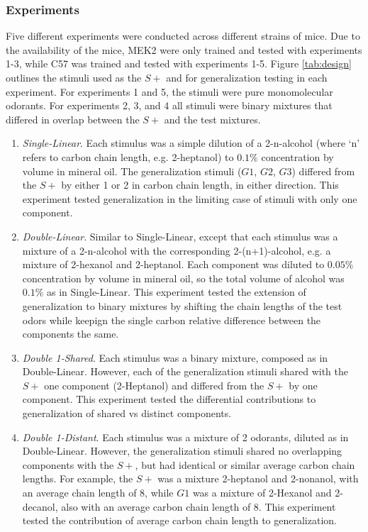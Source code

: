 \subsubsection*{Experiments}
\label{sec:methods_experiment_types}
Five different experiments were conducted across different strains of mice. 
Due to the availability of the mice, MEK2 were only trained and tested with experiments 1-3, while C57 was trained and tested with experiments 1-5.  
Figure \ref{tab:design} outlines the stimuli used as the $S+$ and for generalization testing in each experiment. 
For experiments 1 and 5, the stimuli were pure monomolecular odorants. 
For experiments 2, 3, and 4 all stimuli were binary mixtures that differed in overlap between the $S+$ and the test mixtures. 

\renewcommand{\theenumi}{\Alph{enumi}}
\begin{enumerate}
\item \textit{Single-Linear}. Each stimulus was a simple dilution of a 2-n-alcohol (where `n' refers to carbon chain length, e.g. 2-heptanol) to $0.1\%$ concentration by volume in mineral oil.
The generalization stimuli ($G1$, $G2$, $G3$) differed from the $S+$ by either 1 or 2 in carbon chain length, in either direction.  
This experiment tested generalization in the limiting case of stimuli with only one component.   

\item \textit{Double-Linear}. Similar to Single-Linear, except that each stimulus was a mixture of a 2-n-alcohol with the corresponding 2-(n+1)-alcohol, e.g. a mixture of 2-hexanol and 2-heptanol.  
Each component was diluted to $0.05\%$ concentration by volume in mineral oil, so the total volume of alcohol was $0.1\%$ as in Single-Linear.  
This experiment tested the extension of generalization to binary mixtures by shifting the chain lengths of the test odors while keepign the single carbon relative difference between the components the same.  

\item \textit{Double 1-Shared}. Each stimulus was a binary mixture, composed as in Double-Linear. 
However, each of the generalization stimuli shared with the $S+$ one component (2-Heptanol) and differed from the $S+$ by one component.  
This experiment tested the differential contributions to generalization of shared vs distinct components.  

\item \textit{Double 1-Distant}. Each stimulus was a mixture of 2 odorants, diluted as in Double-Linear. However, the generalization stimuli shared no overlapping components with the $S+$, but had identical or similar average carbon chain lengths. 
For example, the $S+$ was a mixture 2-heptanol and 2-nonanol, with an average chain length of 8, while $G1$ was a mixture of 2-Hexanol and 2-decanol, also with an average carbon chain length of 8.  This experiment tested the contribution of average carbon chain length to generalization.  


\end{enumerate}
